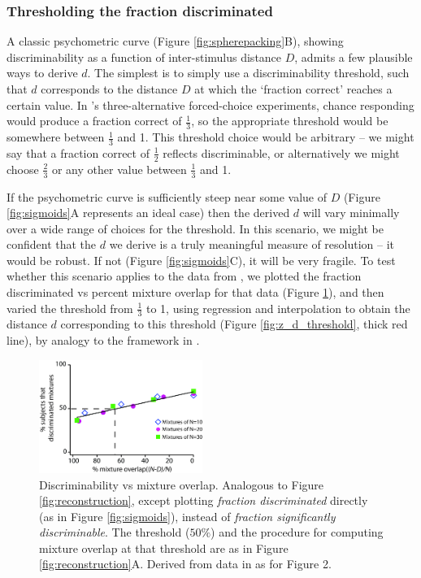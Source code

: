 \documentclass[letterpaper,twocolumn,10pt]{article}
\begin{document}
\subsubsection{Thresholding the fraction discriminated} 

A classic psychometric curve (Figure \ref{fig:spherepacking}B), showing discriminability as a function of inter-stimulus distance $D$, admits a few plausible ways to derive $d$. 
The simplest is to simply use a discriminability threshold, such that $d$ corresponds to the distance $D$ at which the `fraction correct' reaches a certain value.  
In \cite{bushdid_humans_2014}'s three-alternative forced-choice experiments, chance responding would produce a fraction correct of $\frac{1}{3}$, 
so the appropriate threshold would be somewhere between $\frac{1}{3}$ and 1.  
This threshold choice would be arbitrary -- we might say that a fraction correct of $\frac{1}{2}$ reflects discriminable, 
or alternatively we might choose $\frac{2}{3}$ or any other value between $\frac{1}{3}$ and 1.  

If the psychometric curve is sufficiently steep near some value of $D$ (Figure \ref{fig:sigmoids}A represents an ideal case) then the derived $d$ will vary minimally over a wide range of choices for the threshold.  
In this scenario, we might be confident that the $d$ we derive is a truly meaningful measure of resolution -- it would be robust.  
If not (Figure \ref{fig:sigmoids}C), it will be very fragile.  
To test whether this scenario applies to the data from \cite{bushdid_humans_2014}, we plotted the fraction discriminated vs percent mixture overlap for that data (Figure \ref{fig:hardthresh}), and then  
varied the threshold from $\frac{1}{3}$ to 1, 
using regression and interpolation to obtain the distance $d$ corresponding to this threshold (Figure \ref{fig:z_d_threshold}, thick red line), 
by analogy to the framework in \cite{bushdid_humans_2014}.  

\begin{figure}[!hbt]
    \centering
    \includegraphics[width=0.475\textwidth]{figures/Fig6_HardThresh}
    \caption{
Discriminability vs mixture overlap.  Analogous to Figure \ref{fig:reconstruction}, except plotting \textit{fraction discriminated} directly (as in Figure \ref{fig:sigmoids}), instead of \textit{fraction significantly discriminable}. The threshold ($50\%$) and the procedure for computing mixture overlap at that threshold are as in Figure \ref{fig:reconstruction}A. Derived from data in \cite{bushdid_humans_2014} as for Figure 2.}
    \label{fig:hardthresh}
\end{figure} 
\end{document}
